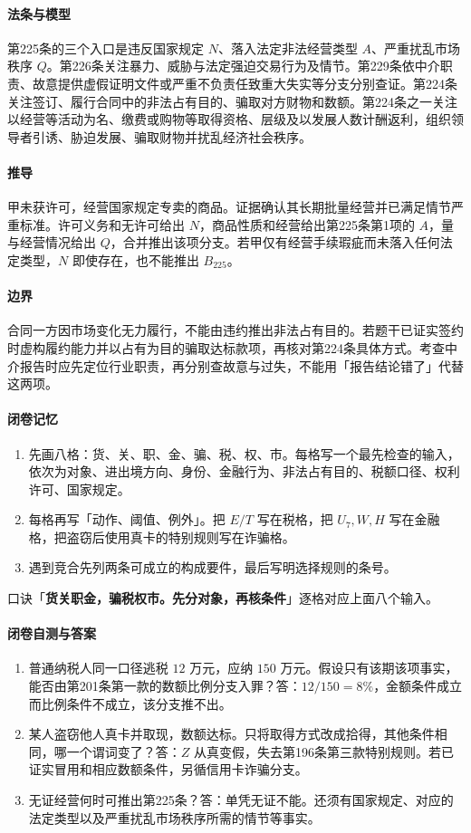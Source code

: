 \paragraph{法条与模型}
第225条的三个入口是违反国家规定 \(N\)、落入法定非法经营类型 \(A\)、严重扰乱市场秩序 \(Q\)。第226条关注暴力、威胁与法定强迫交易行为及情节。第229条依中介职责、故意提供虚假证明文件或严重不负责任致重大失实等分支分别查证。第224条关注签订、履行合同中的非法占有目的、骗取对方财物和数额。第224条之一关注以经营等活动为名、缴费或购物等取得资格、层级及以发展人数计酬返利，组织领导者引诱、胁迫发展、骗取财物并扰乱经济社会秩序。

\paragraph{推导}
甲未获许可，经营国家规定专卖的商品。证据确认其长期批量经营并已满足情节严重标准。许可义务和无许可给出 \(N\)，商品性质和经营给出第225条第1项的 \(A\)，量与经营情况给出 \(Q\)，合并推出该项分支。若甲仅有经营手续瑕疵而未落入任何法定类型，\(N\) 即使存在，也不能推出 \(B_{225}\)。

\paragraph{边界}
合同一方因市场变化无力履行，不能由违约推出非法占有目的。若题干已证实签约时虚构履约能力并以占有为目的骗取达标款项，再核对第224条具体方式。考查中介报告时应先定位行业职责，再分别查故意与过失，不能用「报告结论错了」代替这两项。

\paragraph{闭卷记忆}
\begin{enumerate}
\item 先画八格：货、关、职、金、骗、税、权、市。每格写一个最先检查的输入，依次为对象、进出境方向、身份、金融行为、非法占有目的、税额口径、权利许可、国家规定。
\item 每格再写「动作、阈值、例外」。把 \(E/T\) 写在税格，把 \(U_7,W,H\) 写在金融格，把盗窃后使用真卡的特别规则写在诈骗格。
\item 遇到竞合先列两条可成立的构成要件，最后写明选择规则的条号。
\end{enumerate}
口诀「\textbf{货关职金，骗税权市。先分对象，再核条件}」逐格对应上面八个输入。

\paragraph{闭卷自测与答案}
\begin{enumerate}
\item 普通纳税人同一口径逃税 \(12\) 万元，应纳 \(150\) 万元。假设只有该期该项事实，能否由第201条第一款的数额比例分支入罪？答：\(12/150=8\%\)，金额条件成立而比例条件不成立，该分支推不出。
\item 某人盗窃他人真卡并取现，数额达标。只将取得方式改成拾得，其他条件相同，哪一个谓词变了？答：\(Z\) 从真变假，失去第196条第三款特别规则。若已证实冒用和相应数额条件，另循信用卡诈骗分支。
\item 无证经营何时可推出第225条？答：单凭无证不能。还须有国家规定、对应的法定类型以及严重扰乱市场秩序所需的情节等事实。
\end{enumerate}
